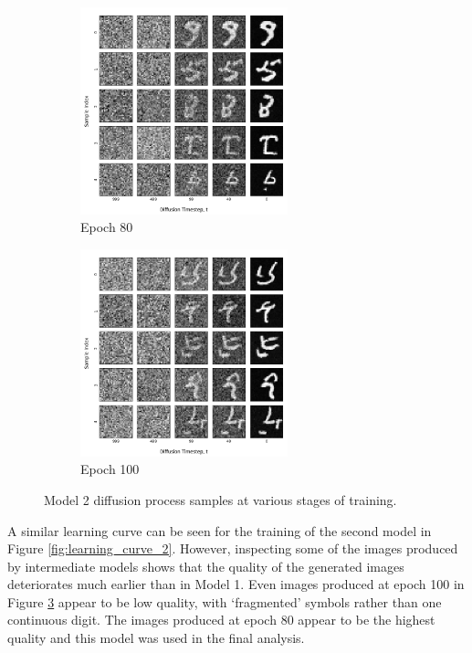 \documentclass[12pt]{article}
\begin{document}
\begin{figure}[hp]
    \begin{subfigure}{0.49\textwidth}
    \includegraphics[width=0.9\linewidth, height=6cm, center]{figures/diffusion_plot_2_0080.png}
    \caption{Epoch 80}
    \label{fig:2_80}
    \end{subfigure}
    \begin{subfigure}{0.49\textwidth}
    \includegraphics[width=0.9\linewidth, height=6cm, center]{figures/diffusion_plot_2_0100.png}
    \caption{Epoch 100}
    \label{fig:2_100}
    \end{subfigure}

    \caption{Model 2 diffusion process samples at various stages of training.}
    \label{fig:diffusion_2}
\end{figure}

A similar learning curve can be seen for the training of the second model in Figure \ref{fig:learning_curve_2}.
However, inspecting some of the images produced by intermediate models shows that the quality of the generated images deteriorates much earlier than in Model 1.
Even images produced at epoch 100 in Figure \ref{fig:diffusion_2} appear to be low quality, with `fragmented' symbols rather than one continuous digit.
The images produced at epoch 80 appear to be the highest quality and this model was used in the final analysis.
\end{document}

